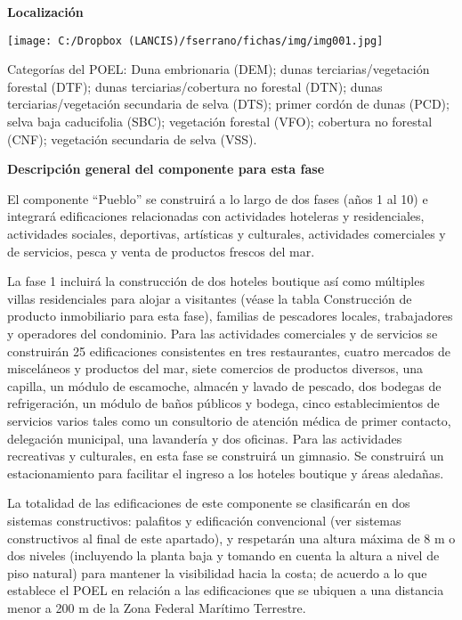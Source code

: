 \documentclass[twoside]{article}
\begin{document}
\begin{multicols}{2}

\bigskip

\footnotesize\textcolor{myblue2} {\textbf{ Localización}}


\bigskip

 \texttt{[image: C:/Dropbox (LANCIS)/fserrano/fichas/img/img001.jpg]}


\bigskip


\bigskip

\footnotesize Categorías del POEL: Duna embrionaria (DEM); dunas terciarias/vegetación forestal (DTF); dunas terciarias/cobertura no forestal (DTN); dunas terciarias/vegetación secundaria de selva (DTS); primer cordón de dunas (PCD); selva baja caducifolia (SBC); vegetación forestal (VFO); cobertura no forestal (CNF); vegetación secundaria de selva (VSS).


\bigskip


\bigskip

\textcolor{myblue2} {\textbf{Descripción general del componente para esta fase}}


\bigskip

\footnotesize El componente “Pueblo” se construirá a lo largo de dos fases (años 1 al 10) e integrará edificaciones relacionadas con actividades hoteleras y residenciales, actividades sociales, deportivas, artísticas y culturales, actividades comerciales y de servicios, pesca y venta de productos frescos del mar.

La fase 1 incluirá la construcción de dos hoteles boutique así como múltiples villas residenciales para alojar a visitantes (véase la tabla Construcción de producto inmobiliario para esta fase), familias de pescadores locales, trabajadores y operadores del condominio. Para las actividades comerciales y de servicios se construirán 25 edificaciones consistentes en tres restaurantes, cuatro mercados de misceláneos y productos del mar, siete comercios de productos diversos, una capilla, un módulo de escamoche, almacén y lavado de pescado, dos bodegas de refrigeración, un módulo de baños públicos y bodega, cinco establecimientos de servicios varios tales como un consultorio de atención médica de primer contacto, delegación municipal, una lavandería y dos oficinas. Para las actividades recreativas y culturales, en esta fase se construirá un gimnasio. Se construirá un estacionamiento para facilitar el ingreso a los hoteles boutique y áreas aledañas.

La totalidad de las edificaciones de este componente se clasificarán en dos sistemas constructivos: palafitos y edificación convencional (ver sistemas constructivos al final de este apartado), y respetarán una altura máxima de 8 m o dos niveles (incluyendo la planta baja y tomando en cuenta la altura a nivel de piso natural) para mantener la visibilidad hacia la costa; de acuerdo a lo que establece el POEL en relación a las edificaciones que se ubiquen a una distancia menor a 200 m de la Zona Federal Marítimo Terrestre.


\end{multicols}
\end{document}
